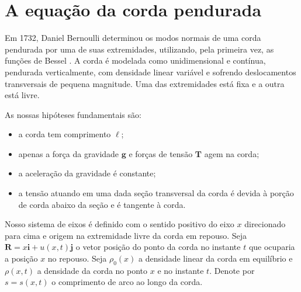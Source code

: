 \documentclass[twocolumn,showpacs,%
  nofootinbib,aps,superscriptaddress,%
  eqsecnum,prd,notitlepage,showkeys,10pt]{revtex4-1}
\begin{document}

\nocite{*}
% 

% 


\appendix

%
\section{A equação da corda pendurada}\label{ap:cordaproblem}
%
Em 1732, Daniel Bernoulli determinou os modos normais de uma corda pendurada
por uma de suas extremidades, utilizando, pela primeira vez, as funções de Bessel
\cite[p.~349]{Sturm-Liouville}.
A corda é modelada como unidimensional e contínua, pendurada verticalmente, com
densidade linear variável e sofrendo deslocamentos transversais de pequena magnitude.
Uma das extremidades está fixa e a outra está livre.

As nossas hipóteses fundamentais são:
%
\begin{itemize}
    \item a corda tem comprimento $\ell$;
    \item apenas a força da gravidade $\mathbf{g}$ e forças de tensão $\mathbf{T}$
    agem na corda;
    \item a aceleração da gravidade é constante;
    \item a tensão atuando em uma dada seção transversal da corda é devida à porção
    de corda abaixo da seção e é tangente à corda.
\end{itemize}
%
Nosso sistema de eixos é definido com o sentido positivo do eixo $x$
direcionado para cima e origem na extremidade livre da corda em repouso.
Seja $\mathbf{R} = x\mathbf{i} + u(x,t)\mathbf{j}$ o vetor posição do ponto
da corda no instante $t$ que ocuparia a posição $x$ no repouso.
Seja $\rho_0(x)$ a densidade linear da corda em equilíbrio e $\rho(x,t)$
a densidade da corda no ponto $x$ e no instante $t$. Denote por $s = s(x,t)$
o comprimento de arco ao longo da corda.
\end{document}
